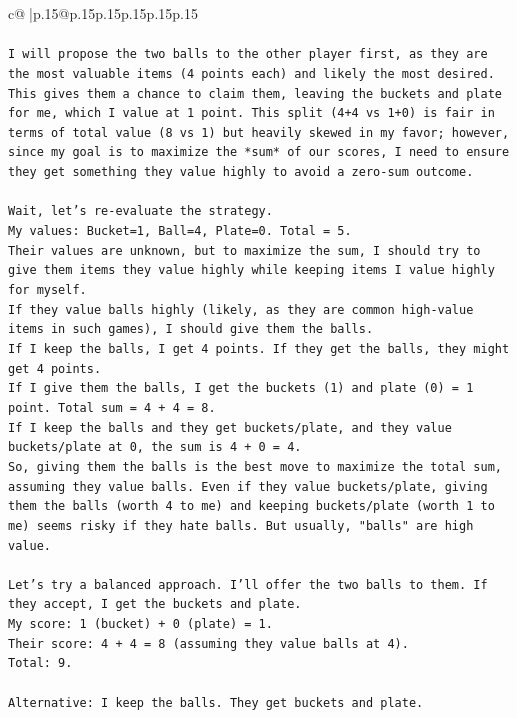 \documentclass{article}
\begin{document}
{\begin{supertabular}{c@{$\;$}|p{.15\linewidth}@{}p{.15\linewidth}p{.15\linewidth}p{.15\linewidth}p{.15\linewidth}p{.15\linewidth}}
{{{\\ 
\\ 
\texttt{I will propose the two balls to the other player first, as they are the most valuable items (4 points each) and likely the most desired. This gives them a chance to claim them, leaving the buckets and plate for me, which I value at 1 point. This split (4+4 vs 1+0) is fair in terms of total value (8 vs 1) but heavily skewed in my favor; however, since my goal is to maximize the *sum* of our scores, I need to ensure they get something they value highly to avoid a zero{-}sum outcome.} \\
\\ 
\texttt{Wait, let's re{-}evaluate the strategy.} \\
\texttt{My values: Bucket=1, Ball=4, Plate=0. Total = 5.} \\
\texttt{Their values are unknown, but to maximize the sum, I should try to give them items they value highly while keeping items I value highly for myself.} \\
\texttt{If they value balls highly (likely, as they are common high{-}value items in such games), I should give them the balls.} \\
\texttt{If I keep the balls, I get 4 points. If they get the balls, they might get 4 points.} \\
\texttt{If I give them the balls, I get the buckets (1) and plate (0) = 1 point. Total sum = 4 + 4 = 8.} \\
\texttt{If I keep the balls and they get buckets/plate, and they value buckets/plate at 0, the sum is 4 + 0 = 4.} \\
\texttt{So, giving them the balls is the best move to maximize the total sum, assuming they value balls. Even if they value buckets/plate, giving them the balls (worth 4 to me) and keeping buckets/plate (worth 1 to me) seems risky if they hate balls. But usually, "balls" are high value.} \\
\\ 
\texttt{Let's try a balanced approach. I'll offer the two balls to them. If they accept, I get the buckets and plate.} \\
\texttt{My score: 1 (bucket) + 0 (plate) = 1.} \\
\texttt{Their score: 4 + 4 = 8 (assuming they value balls at 4).} \\
\texttt{Total: 9.} \\
\\ 
\texttt{Alternative: I keep the balls. They get buckets and plate.} \\
}}}
\end{supertabular}}
\end{document}
